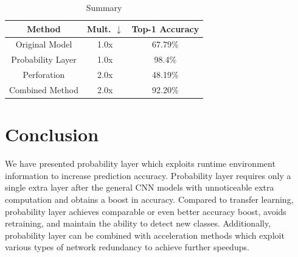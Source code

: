 \documentclass{article}
\begin{document}



\begin{table}[h]
    \caption{Summary}
    \label{tab:my_label}

    \centering
    \begin{tabular}{ ccc } 
     Method & Mult. $\downarrow$ & Top-1 Accuracy \\ 
     \hline
     Original Model & 1.0x & 67.79\% \\
     Probability Layer & 1.0x & 98.4\% \\ 
     Perforation & 2.0x & 48.19\% \\ 
     \hline
     Combined Method & 2.0x & 92.20\%
    \end{tabular}
\end{table}




\section{Conclusion}
We have presented probability layer which exploits runtime environment information to increase prediction accuracy. Probability layer requires only a single extra layer after the general CNN models with unnoticeable extra computation and obtains a boost in accuracy. Compared to transfer learning, probability layer achieves comparable or even better accuracy boost, avoids retraining, and maintain the ability to detect new classes. Additionally, probability layer can be combined with acceleration methods which exploit various types of network redundancy to achieve further speedups.





\end{document}
